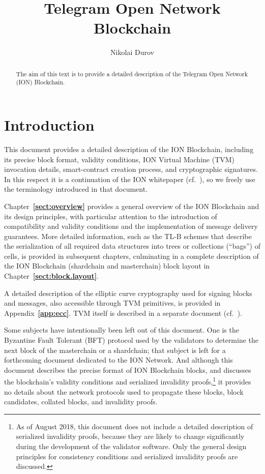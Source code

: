 \documentclass[12pt,oneside]{article}
\title{Telegram Open Network Blockchain}
\author{Nikolai Durov}
\def\refpoint#1{{\rm\textbf{\ref{#1}}}}
\let\ptref=\refpoint
\def\markbothsame#1{\fancyhead[C]{#1}}
\begin{document}
\maketitle

\begin{abstract}
  The aim of this text is to provide a detailed description of the
  Telegram Open Network (ION) Blockchain.
\end{abstract}

\section*{Introduction}
\markbothsame{Introduction}

This document provides a detailed description of the ION Blockchain, including its precise block format, validity conditions, ION Virtual Machine (TVM) invocation details, smart-contract creation process, and cryptographic signatures. In this respect it is a continuation of the ION whitepaper (cf.~\cite{ION}), so we freely use the terminology introduced in that document.

Chapter~\ptref{sect:overview} provides a general overview of the ION Blockchain and its design principles, with particular attention to the introduction of compatibility and validity conditions and the implementation of message delivery guarantees. More detailed information, such as the TL-B schemes that describe the serialization of all required data structures into trees or collections (``bags'') of cells, is provided in subsequent chapters, culminating in a complete description of the ION Blockchain (shardchain and masterchain) block layout in Chapter~\ptref{sect:block.layout}.

A detailed description of the elliptic curve cryptography used for signing blocks and messages, also accessible through TVM primitives, is provided in Appendix~\ptref{app:ecc}. TVM itself is described in a separate document (cf.~\cite{TVM}).

Some subjects have intentionally been left out of this document. One is the Byzantine Fault Tolerant (BFT) protocol used by the validators to determine the next block of the masterchain or a shardchain; that subject is left for a forthcoming document dedicated to the ION Network. And although this document describes the precise format of ION Blockchain blocks, and discusses the blockchain's validity conditions and serialized invalidity proofs,\footnote{As of August 2018, this document does not include a detailed description of serialized invalidity proofs, because they are likely to change significantly during the development of the validator software. Only the general design principles for consistency conditions and serialized invalidity proofs are discussed.}  it provides no details about the network protocols used to propagate these blocks, block candidates, collated blocks, and invalidity proofs.
\end{document}
